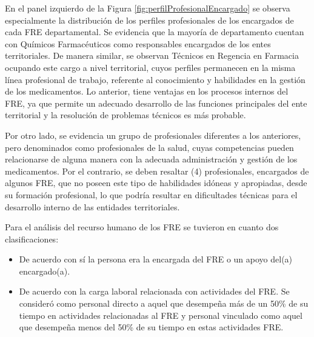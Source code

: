 \documentclass[
]{book}
\begin{document}
En el panel izquierdo de la Figura \ref{fig:perfilProfesionalEncargado} se observa especialmente la distribución de los perfiles profesionales de los encargados de cada FRE departamental. Se evidencia que la mayoría de departamento cuentan con Químicos Farmacéuticos como responsables encargados de los entes territoriales. De manera similar, se observan Técnicos en Regencia en Farmacia ocupando este cargo a nivel territorial, cuyos perfiles permanecen en la misma línea profesional de trabajo, referente al conocimiento y habilidades en la gestión de los medicamentos. Lo anterior, tiene ventajas en los procesos internos del FRE, ya que permite un adecuado desarrollo de las funciones principales del ente territorial y la resolución de problemas técnicos es más probable.

Por otro lado, se evidencia un grupo de profesionales diferentes a los anteriores, pero denominados como profesionales de la salud, cuyas competencias pueden relacionarse de alguna manera con la adecuada administración y gestión de los medicamentos. Por el contrario, se deben resaltar (4) profesionales, encargados de algunos FRE, que no poseen este tipo de habilidades idóneas y apropiadas, desde su formación profesional, lo que podría resultar en dificultades técnicas para el desarrollo interno de las entidades territoriales.

Para el análisis del recurso humano de los FRE se tuvieron en cuanto dos clasificaciones:

\begin{itemize}
\item
  De acuerdo con sí la persona era la encargada del FRE o un apoyo del(a) encargado(a).
\item
  De acuerdo con la carga laboral relacionada con actividades del FRE. Se consideró como personal directo a aquel que desempeña más de un 50\% de su tiempo en actividades relacionadas al FRE y personal vinculado como aquel que desempeña menos del 50\% de su tiempo en estas actividades FRE.
\end{itemize}
\end{document}
